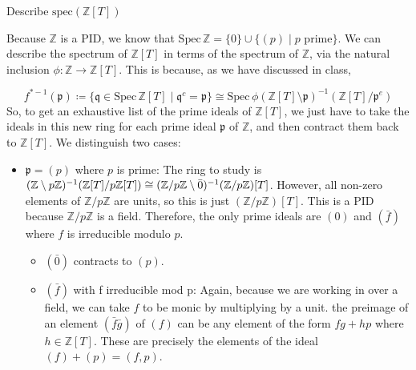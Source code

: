 \begin{problem}\label{itm:integers_polynomial_ring_spectrum}
Describe $\text{spec}(\mathbb{Z}[T])$
\begin{sol}

    Because $\mathbb{Z}$ is a PID, we know that
    $\text{Spec}\,\mathbb{Z} = \{0\} \cup \{(p) \mid p \text{ prime}\}$.
    We can describe the spectrum of $\mathbb{Z}[T]$ in terms of the spectrum of $\mathbb{Z}$,
    via the natural inclusion $\phi:\mathbb{Z} \to \mathbb{Z}[T]$.
    This is because, as we have discussed in class,

    \[
        f^{*-1}(\mathfrak{p})
        \coloneqq
        \{\mathfrak{q} \in \text{Spec} \, \mathbb{Z}[T] \mid \mathfrak{q}^c = \mathfrak{p}\}
        \cong \text{Spec} \, \phi(\mathbb{Z}[T] \setminus \mathfrak{p})^{-1}( \mathbb{Z}[T] / \mathfrak{p}^e)
    \]
    So, to get an exhaustive list of the prime ideals of $\mathbb{Z}[T]$, we just have to take the
    ideals in this new ring for each prime ideal $\mathfrak{p}$ of $\mathbb{Z}$, and then
    contract them back to $\mathbb{Z}[T]$.
    We distinguish two cases:

    \begin{itemize}
        \item $\mathfrak{p} = (p)$ where $p$ is prime:
        The ring to study is $(\mathbb{Z} \setminus p \mathbb{Z})^{-1} (\mathbb{Z}[T]/p\mathbb{Z}[T]) \cong \linebreak
        (\mathbb{Z}/p\mathbb{Z} \setminus \bar{0})^{-1} (\mathbb{Z}/p\mathbb{Z})[T]$.
        However, all non-zero elements of $\mathbb{Z}/p\mathbb{Z}$ are units, so this is just
        $(\mathbb{Z}/p\mathbb{Z})[T]$.
        This is a PID because $\mathbb{Z}/p\mathbb{Z}$ is a field.
        Therefore, the only prime ideals are $(0)$ and $(\bar{f})$ where $f$ is irreducible modulo $p$.

        \begin{itemize}
            \item $(\bar{0})$ contracts to $(p)$.
            \item $(\bar{f})$ with f irreducible mod p: Again, because we are working in over a field,
            we can take  $f$ to be monic by multiplying by a unit.
            the preimage of an element $(\bar{f}\bar{g})$ of $(f)$ can be any element of the
            form $f g + h p$ where $h \in \mathbb{Z}[T]$.
            These are precisely the elements of the ideal
            $(f) + (p) = (f, p)$.

        \end{itemize}


\end{itemize}
\end{sol}
\end{problem}
